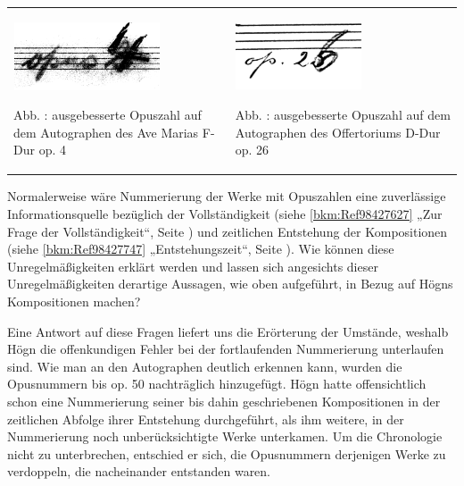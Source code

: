 \documentclass[a4paper]{article}
\newcounter{Abb}
\renewcommand\theAbb{\arabic{Abb}}
\begin{document}
\begin{center}
\begin{minipage}{9.241cm}
\begin{center}
\tablefirsthead{}
\tablehead{}
\tabletail{}
\tablelasttail{}
\begin{supertabular}{m{4.5470004cm}m{4.294cm}}

\includegraphics[width=4.364cm,height=2.007cm]{pictures/zulassungsarbeit-img060.png}

Abb. \stepcounter{Abb}{\theAbb}: ausgebesserte Opuszahl auf dem
Autographen des Ave Marias F-Dur op. 4 &

\includegraphics[width=3.739cm,height=2cm]{pictures/zulassungsarbeit-img061.png}

Abb. \stepcounter{Abb}{\theAbb}: ausgebesserte Opuszahl auf dem
Autographen des Offertoriums D-Dur op. 26\\
\end{supertabular}
\end{center}
\end{minipage}
\end{center}
Normalerweise wäre Nummerierung der Werke mit Opuszahlen eine
zuverlässige Informationsquelle bezüglich der Vollständigkeit (siehe
\ref{bkm:Ref98427627} „Zur Frage der Vollständigkeit“, Seite
\pageref{bkm:Ref98427627}) und zeitlichen Entstehung der Kompositionen
(siehe \ref{bkm:Ref98427747} „Entstehungszeit“, Seite
\pageref{bkm:Ref98427747}). Wie können diese Unregelmäßigkeiten erklärt
werden und lassen sich angesichts dieser Unregelmäßigkeiten derartige
Aussagen, wie oben aufgeführt, in Bezug auf Högns Kompositionen machen?

Eine Antwort auf diese Fragen liefert uns die Erörterung der Umstände,
weshalb Högn die offenkundigen Fehler bei der fortlaufenden
Nummerierung unterlaufen sind. Wie man an den Autographen deutlich
erkennen kann, wurden die Opusnummern bis op. 50 nachträglich
hinzugefügt. Högn hatte offensichtlich schon eine Nummerierung seiner
bis dahin geschriebenen Kompositionen in der zeitlichen Abfolge ihrer
Entstehung durchgeführt, als ihm weitere, in der Nummerierung noch
unberücksichtigte Werke unterkamen. Um die Chronologie nicht zu
unterbrechen, entschied er sich, die Opusnummern derjenigen Werke zu
verdoppeln, die nacheinander entstanden waren.
\end{document}
